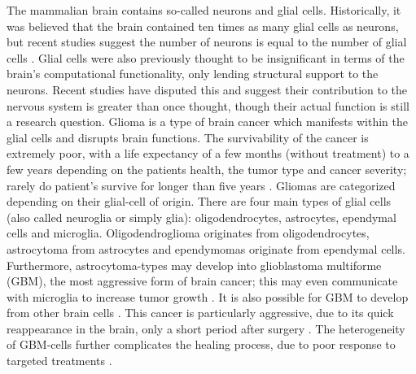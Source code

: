 The mammalian brain contains so-called neurons and glial cells. Historically, it was believed that the brain contained ten times as many glial cells as neurons, but recent studies suggest the number of neurons is equal to the number of glial cells \cite{von2016search}. Glial cells were also previously thought to be insignificant in terms of the brain's computational functionality, only lending structural support to the neurons. Recent studies have disputed this and suggest their contribution to the nervous system is greater than once thought, though their actual function is still a research question. Glioma is a type of brain cancer which manifests within the glial cells and disrupts brain functions. The survivability of the cancer is extremely poor, with a life expectancy of a few months (without treatment) to a few years depending on the patients health, the tumor type and cancer severity; rarely do patient's survive for longer than five years \cite{glialcells, gallego2015nonsurgical, bleeker2012recent}. Gliomas are categorized depending on their glial-cell of origin. There are four main types of glial cells (also called neuroglia or simply glia): oligodendrocytes, astrocytes, ependymal cells and microglia. Oligodendroglioma originates from oligodendrocytes, astrocytoma from astrocytes and ependymomas originate from ependymal cells. Furthermore, astrocytoma-types may develop into glioblastoma multiforme (GBM), the most aggressive form of brain cancer; this may even communicate with  microglia to increase tumor growth \cite{maas2020glioblastoma}. It is also possible for GBM to develop from other brain cells \cite{glialcells}. This cancer is particularly aggressive, due to its quick reappearance in the brain, only a short period after surgery \cite{gallego2015nonsurgical}. The heterogeneity of GBM-cells further complicates the healing process, due to poor response to targeted treatments \cite{dirkse2019stem}.

